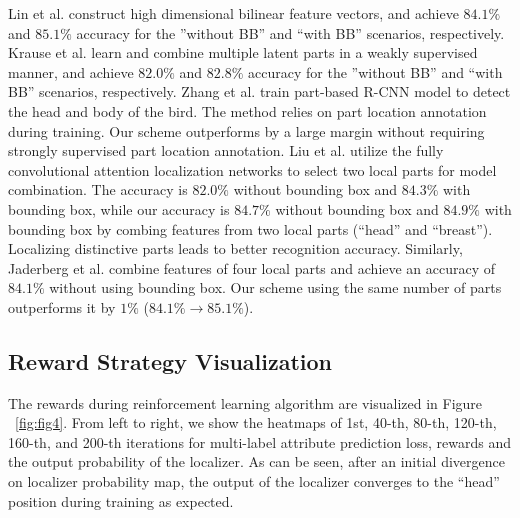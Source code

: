 \documentclass{article}
\begin{document}
Lin et al. \cite{bd16} construct high dimensional bilinear feature vectors, and achieve $84.1\%$ and $85.1\%$ accuracy for the ''without BB'' and ``with BB'' scenarios, respectively.
Krause et al. \cite{bd22} learn and combine multiple latent parts in a weakly supervised manner, and achieve $82.0\%$ and $82.8\%$ accuracy for the ''without BB'' and ``with BB'' scenarios, respectively.
Zhang et al. \cite{bd11} train part-based R-CNN model to detect the head and body of the bird. The method relies on part location annotation during training.
Our scheme outperforms \cite{bd11} by a large margin without requiring strongly supervised part location annotation.
Liu et al. \cite{nips1} utilize the fully convolutional attention localization networks to select two local parts for model combination. The accuracy is $82.0\%$ without bounding box and $84.3\%$ with bounding box, while our accuracy is $84.7\%$ without bounding box and $84.9\%$ with bounding box by combing features from two local parts (``head'' and ``breast''). Localizing distinctive parts leads to better recognition accuracy.
Similarly, Jaderberg et al. \cite{jaderberg2015spatial} combine features of four local parts and achieve an accuracy of $84.1\%$ without using bounding box. Our scheme using the same number of parts outperforms it by $1\%$ ($84.1\% \to 85.1\%$).


\subsection{Reward Strategy Visualization}
The rewards during reinforcement learning algorithm are visualized in Figure ~\ref{fig:fig4}.
From left to right, we show the heatmaps of 1st, 40-th, 80-th, 120-th, 160-th, and 200-th iterations for multi-label attribute prediction loss, rewards and the output probability of the localizer.
As can be seen, after an initial divergence on localizer probability map, the output of the localizer converges to the ``head'' position during training as expected.
\end{document}
